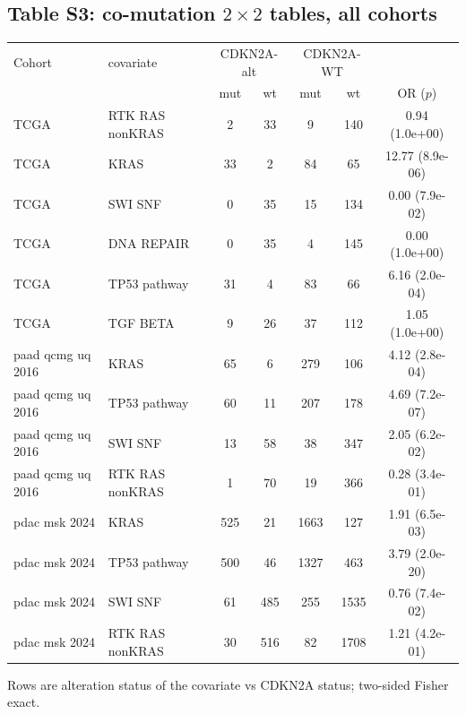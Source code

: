 \subsection{Table S3: co-mutation $2\times2$ tables, all cohorts}
\begin{center}\small\begin{tabular}{ll|cc|cc|c}\hline\hline
Cohort & covariate & \multicolumn{2}{c|}{CDKN2A-alt} & \multicolumn{2}{c|}{CDKN2A-WT} & \\
 & & mut & wt & mut & wt & OR ($p$)\\\hline
TCGA & RTK RAS nonKRAS & 2 & 33 & 9 & 140 & 0.94 (1.0e+00)\\
TCGA & KRAS & 33 & 2 & 84 & 65 & 12.77 (8.9e-06)\\
TCGA & SWI SNF & 0 & 35 & 15 & 134 & 0.00 (7.9e-02)\\
TCGA & DNA REPAIR & 0 & 35 & 4 & 145 & 0.00 (1.0e+00)\\
TCGA & TP53 pathway & 31 & 4 & 83 & 66 & 6.16 (2.0e-04)\\
TCGA & TGF BETA & 9 & 26 & 37 & 112 & 1.05 (1.0e+00)\\
paad qcmg uq 2016 & KRAS & 65 & 6 & 279 & 106 & 4.12 (2.8e-04)\\
paad qcmg uq 2016 & TP53 pathway & 60 & 11 & 207 & 178 & 4.69 (7.2e-07)\\
paad qcmg uq 2016 & SWI SNF & 13 & 58 & 38 & 347 & 2.05 (6.2e-02)\\
paad qcmg uq 2016 & RTK RAS nonKRAS & 1 & 70 & 19 & 366 & 0.28 (3.4e-01)\\
pdac msk 2024 & KRAS & 525 & 21 & 1663 & 127 & 1.91 (6.5e-03)\\
pdac msk 2024 & TP53 pathway & 500 & 46 & 1327 & 463 & 3.79 (2.0e-20)\\
pdac msk 2024 & SWI SNF & 61 & 485 & 255 & 1535 & 0.76 (7.4e-02)\\
pdac msk 2024 & RTK RAS nonKRAS & 30 & 516 & 82 & 1708 & 1.21 (4.2e-01)\\
\hline\hline\end{tabular}\end{center}
Rows are alteration status of the covariate vs CDKN2A status; two-sided Fisher exact.


